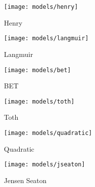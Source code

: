 \begin{figure}[p]
	\centering

	\begin{subfigure}{0.3\linewidth}

		\parbox[c]{1.0\linewidth}{\caption{Henry}%
			\label{pyg:fgr:henryex}}

		\parbox[b]{1.0\linewidth}{%

			\texttt{[image: models/henry]}}
	\end{subfigure}
	\begin{subfigure}{0.3\linewidth}

		\parbox[c]{1.0\linewidth}{\caption{Langmuir}%
			\label{pyg:fgr:langmuirex}}

		\parbox[b]{1.0\linewidth}{%

			\texttt{[image: models/langmuir]}}
	\end{subfigure}
	\begin{subfigure}{0.3\linewidth}

		\parbox[c]{1.0\linewidth}{\caption{BET}%
			\label{pyg:fgr:betex}}

		\parbox[b]{1.0\linewidth}{%

			\texttt{[image: models/bet]}}
	\end{subfigure}

	\begin{subfigure}{0.3\linewidth}

		\parbox[c]{1.0\linewidth}{\caption{Toth}%
			\label{pyg:fgr:tothex}}

		\parbox[b]{1.0\linewidth}{%

			\texttt{[image: models/toth]}}
	\end{subfigure}
	\begin{subfigure}{0.3\linewidth}

		\parbox[c]{1.0\linewidth}{\caption{Quadratic}%
			\label{pyg:fgr:quadraticex}}

		\parbox[b]{1.0\linewidth}{%

			\texttt{[image: models/quadratic]}}
	\end{subfigure}
	\begin{subfigure}{0.3\linewidth}

		\parbox[c]{1.0\linewidth}{\caption{Jensen Seaton}%
			\label{pyg:fgr:jseatonex}}

		\parbox[b]{1.0\linewidth}{%

			\texttt{[image: models/jseaton]}}
	\end{subfigure}
	\\
	\begin{subfigure}{0.3\linewidth}


\end{subfigure}
\end{figure}
